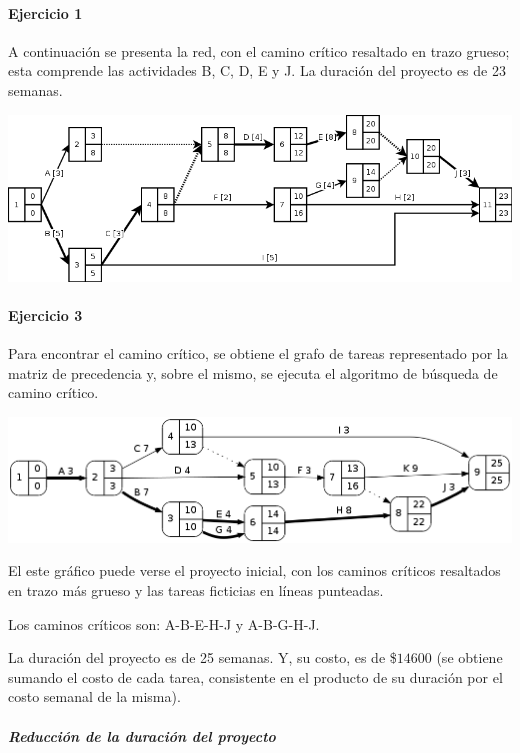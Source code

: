 \documentclass[a4paper,10pt]{article}
\begin{document}
\paragraph{Ejercicio 1} A continuación se presenta la red, con el camino crítico resaltado en trazo grueso; esta comprende las actividades B, C, D, E y J. La duración del proyecto es de 23 semanas.

    \begin{center}
	\includegraphics[scale=0.55,keepaspectratio=true]{img/ej1-red.png} 
	\end{center}
  
\paragraph{Ejercicio 3}
  Para encontrar el camino crítico, se obtiene el grafo de tareas representado por la matriz de precedencia y, sobre el mismo, se ejecuta el algoritmo de búsqueda de camino crítico.

  \begin{center}
    \includegraphics[scale=0.4,keepaspectratio=true]{img/ej3-0.png} 
  \end{center}

  El este gráfico puede verse el proyecto inicial, con los caminos críticos resaltados en trazo más grueso y las tareas ficticias en líneas punteadas.

  Los caminos críticos son: A-B-E-H-J y A-B-G-H-J.

  La duración del proyecto es de 25 semanas. Y, su costo, es de \$$14600$ (se obtiene sumando el costo de cada tarea, consistente en el producto de su duración por el costo semanal de la misma).

  \subparagraph{Reducción de la duración del proyecto}
\end{document}
